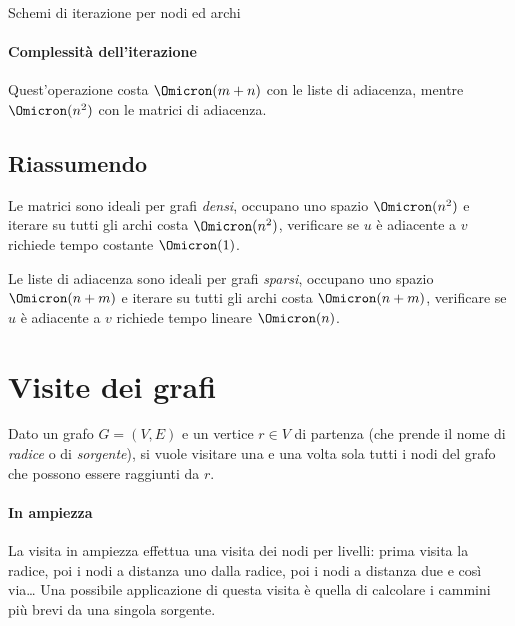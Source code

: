 \begin{algorithm}[H]
	\caption[Come iterare su nodi ed archi]{Schemi di iterazione per nodi ed archi}

	\BlankLine

	\BlankLine
\end{algorithm}

\paragraph{Complessità dell'iterazione}
Quest'operazione costa \(\Omicron(m+n)\) con le liste di adiacenza, mentre \(\Omicron(n^2)\) con le matrici di adiacenza.

\subsection*{Riassumendo}

Le matrici sono ideali per grafi \emph{densi}, occupano uno spazio \(\Omicron(n^2)\) e iterare su tutti gli archi costa \(\Omicron(n^2)\), verificare se \(u\) è adiacente a \(v\) richiede tempo costante \(\Omicron(1)\).

Le liste di adiacenza sono ideali per grafi \emph{sparsi}, occupano uno spazio \(\Omicron(n+m)\) e iterare su tutti gli archi costa \(\Omicron(n+m)\), verificare se \(u\) è adiacente a \(v\) richiede tempo lineare \(\Omicron(n)\).

\clearpage
\section{Visite dei grafi}

Dato un grafo \(G = (V,E)\) e un vertice \(r \in V\) di partenza (che prende il nome di \emph{radice} o di \emph{sorgente}), si vuole visitare una e una volta sola tutti i nodi del grafo che possono essere raggiunti da \(r\).

\paragraph{In ampiezza}
La visita in ampiezza effettua una visita dei nodi per livelli: prima visita la radice, poi i nodi a distanza uno dalla radice, poi i nodi a distanza due e così via\dots
Una possibile applicazione di questa visita è quella di calcolare i cammini più brevi da una singola sorgente.

